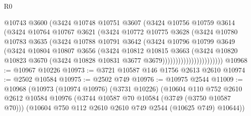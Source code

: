\begin{lexlean}{R0}
\begin{coremodule}
                            @10743
                            @3600
                            (@3424
                              @10748
                              @10751
                              @3607
                              (@3424
                                @10756
                                @10759
                                @3614
                                (@3424
                                  @10764
                                  @10767
                                  @3621
                                  (@3424
                                    @10772
                                    @10775
                                    @3628
                                    (@3424
                                      @10780
                                      @10783
                                      @3635
                                      (@3424
                                        @10788
                                        @10791
                                        @3642
                                        (@3424
                                          @10796
                                          @10799
                                          @3649
                                          (@3424
                                            @10804
                                            @10807
                                            @3656
                                            (@3424
                                              @10812
                                              @10815
                                              @3663
                                              (@3424
                                                @10820
                                                @10823
                                                @3670
                                                (@3424
                                                  @10828
                                                  @10831
                                                  @3677
                                                  @3679)))))))))))))))))))))))
@10968 := @10967 @10226
@10973 := @3721 @10587 @146 @1756 @2613 @2610
@10974 := @2502 @10584
@10975 := @2502 @749
@10976 := @10975 @2544
@11009 := @10968
    (@10973
      (@10974 @10976)
      (@3731 @10226)
      (@10604
        @110
        @752
        @2610
        @2612
        @10584
        @10976
        (@3744 @10587 @70 @10584 (@3749 (@3750 @10587 @70)))
        (@10604 @750 @112 @2610 @2610 @749 @2544 (@10625 @749) @10644))

\end{coremodule}
\end{lexlean}
